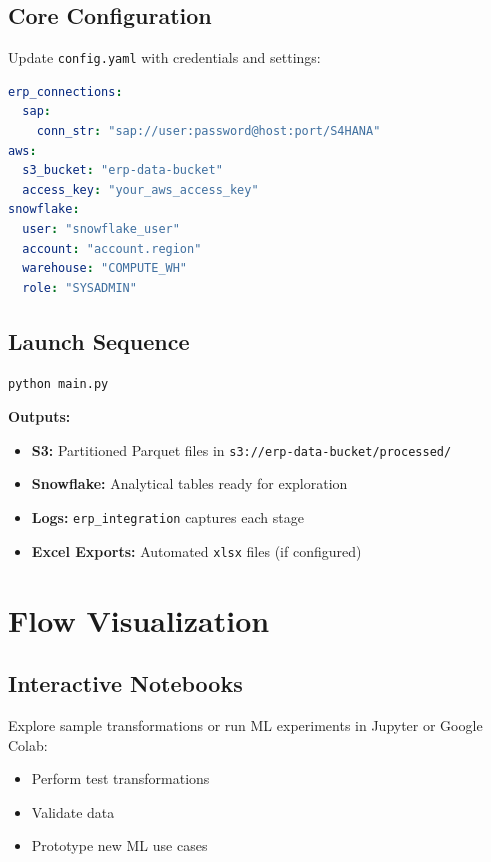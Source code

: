 \documentclass[a4paper,10pt]{article}
\begin{document}
\section{Core Configuration}
Update \texttt{config.yaml} with credentials and settings:
\begin{lstlisting}[language=yaml]
erp_connections:
  sap:
    conn_str: "sap://user:password@host:port/S4HANA"
aws:
  s3_bucket: "erp-data-bucket"
  access_key: "your_aws_access_key"
snowflake:
  user: "snowflake_user"
  account: "account.region"
  warehouse: "COMPUTE_WH"
  role: "SYSADMIN"
\end{lstlisting}

\section{Launch Sequence}
\begin{lstlisting}[language=bash]
python main.py
\end{lstlisting}

\noindent
\textbf{Outputs:}
\begin{itemize}[leftmargin=2em]
    \item \textbf{S3:} Partitioned Parquet files in \texttt{s3://erp-data-bucket/processed/}
    \item \textbf{Snowflake:} Analytical tables ready for exploration
    \item \textbf{Logs:} \texttt{erp_integration} captures each stage
    \item \textbf{Excel Exports:} Automated \texttt{xlsx} files (if configured)
\end{itemize}

\chapter{Flow Visualization}

\section{Interactive Notebooks}
Explore sample transformations or run ML experiments in Jupyter or Google Colab:
\begin{itemize}[leftmargin=2em]
    \item Perform test transformations
    \item Validate data
    \item Prototype new ML use cases
\end{itemize}
\end{document}
